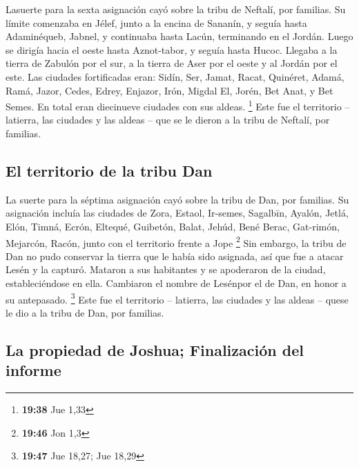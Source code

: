  Lasuerte para la sexta asignación cayó sobre la tribu de
Neftalí, por familias.  Su límite comenzaba en Jélef,
junto a la encina de Sananín, y seguía hasta Adaminéqueb, Jabnel, y
continuaba hasta Lacún, terminando en el Jordán.  Luego
se dirigía hacia el oeste hasta Aznot-tabor, y seguía hasta Hucoc.
Llegaba a la tierra de Zabulón por el sur, a la tierra de Aser por el
oeste y al Jordán por el este.  Las ciudades fortificadas
eran: Sidín, Ser, Jamat, Racat, Quinéret,  Adamá, Ramá,
Jazor,  Cedes, Edrey, Enjazor,  Irón,
Migdal El, Jorén, Bet Anat, y Bet Semes. En total eran diecinueve
ciudades con sus aldeas. \footnote{\textbf{19:38} Jue 1,33}
 Este fue el territorio -- latierra, las ciudades y las
aldeas -- que se le dieron a la tribu de Neftalí, por familias.

\hypertarget{el-territorio-de-la-tribu-dan}{%
\subsection{El territorio de la tribu
Dan}\label{el-territorio-de-la-tribu-dan}}

 La suerte para la séptima asignación cayó sobre la tribu
de Dan, por familias.  Su asignación incluía las ciudades
de Zora, Estaol, Ir-semes,  Sagalbīn, Ayalón, Jetlá,
 Elón, Timná, Ecrón,  Eltequé, Guibetón,
Balat,  Jehúd, Bené Berac, Gat-rimón, 
Mejarcón, Racón, junto con el territorio frente a Jope \footnote{\textbf{19:46}
  Jon 1,3}  Sin embargo, la tribu de Dan no pudo
conservar la tierra que le había sido asignada, así que fue a atacar
Lesén y la capturó. Mataron a sus habitantes y se apoderaron de la
ciudad, estableciéndose en ella. Cambiaron el nombre de Lesénpor el de
Dan, en honor a su antepasado. \footnote{\textbf{19:47} Jue 18,27; Jue
  18,29}  Este fue el territorio -- latierra, las
ciudades y las aldeas -- quese le dio a la tribu de Dan, por familias.

\hypertarget{la-propiedad-de-joshua-finalizaciuxf3n-del-informe}{%
\subsection{La propiedad de Joshua; Finalización del
informe}\label{la-propiedad-de-joshua-finalizaciuxf3n-del-informe}}

